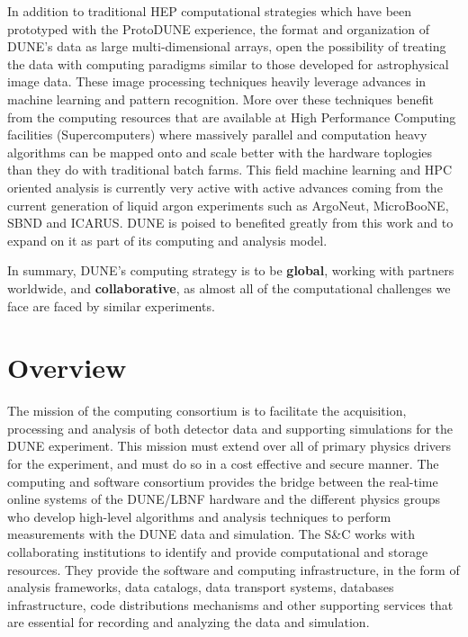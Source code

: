 In addition to traditional HEP computational strategies which have been prototyped with the ProtoDUNE experience, the format and organization of DUNE's data as large multi-dimensional arrays, open the possibility of treating the data with computing paradigms similar to those developed for astrophysical image data.  These image processing techniques heavily leverage advances in machine learning and pattern recognition.  More over these techniques benefit from the computing resources that are available at High Performance Computing facilities (Supercomputers) where massively parallel and computation heavy algorithms can be mapped onto and scale better with the hardware toplogies than they do with traditional batch farms.  This field machine learning and HPC oriented analysis is currently very active with active advances coming from the current generation of liquid argon experiments such as ArgoNeut, MicroBooNE, SBND and ICARUS.  DUNE is poised to benefited greatly from this work and to expand on it as part of its computing and analysis model.

In summary, DUNE's computing strategy is to be {\bf global}, working with partners worldwide, and {\bf collaborative}, as almost all of the computational challenges we face are faced by similar experiments.

\section{Overview}
\label{ch:exec-comp-ovr}
The mission of the computing consortium is to facilitate the acquisition, processing and analysis of both detector data and supporting simulations for the DUNE experiment.  This mission must extend over all of primary physics drivers for the experiment, and must do so in a cost effective and secure manner. The computing and software consortium  provides the bridge between the real-time online systems of the DUNE/LBNF hardware and the different physics groups who develop high-level algorithms and analysis techniques to perform measurements with the DUNE data and simulation. The S\&C works with collaborating institutions to identify and provide computational and storage resources.  They provide the software and computing infrastructure, in the form of analysis frameworks, data catalogs, data transport systems, databases infrastructure, code distributions mechanisms and other supporting services that are essential for recording and analyzing the data and simulation.

